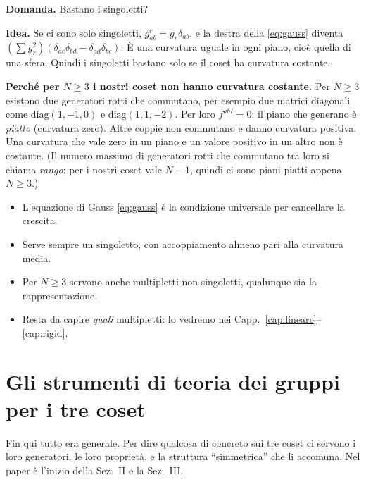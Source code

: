 \documentclass[11pt,a4paper]{article}
\numberwithin{equation}{section}
\theoremstyle{remark}
\begin{document}
\textbf{Domanda.} Bastano i singoletti?

\textbf{Idea.} Se ci sono solo singoletti, $g^r_{ab}=g_r\delta_{ab}$, e la destra della \eqref{eq:gauss} diventa $(\sum g_r^2)(\delta_{ac}\delta_{bd}-\delta_{ad}\delta_{bc})$. È una curvatura uguale in ogni piano, cioè quella di una sfera. Quindi i singoletti bastano solo se il coset ha curvatura costante.

\textbf{Perché per $N\ge3$ i nostri coset non hanno curvatura costante.} Per $N\ge3$ esistono due generatori rotti che commutano, per esempio due matrici diagonali come $\mathrm{diag}(1,-1,0)$ e $\mathrm{diag}(1,1,-2)$. Per loro $f^{abI}=0$: il piano che generano è \emph{piatto} (curvatura zero). Altre coppie non commutano e danno curvatura positiva. Una curvatura che vale zero in un piano e un valore positivo in un altro non è costante. (Il numero massimo di generatori rotti che commutano tra loro si chiama \emph{rango}; per i nostri coset vale $N-1$, quindi ci sono piani piatti appena $N\ge3$.)

\begin{porta}
\begin{itemize}[nosep]
\item L'equazione di Gauss \eqref{eq:gauss} è la condizione universale per cancellare la crescita.
\item Serve sempre un singoletto, con accoppiamento almeno pari alla curvatura media.
\item Per $N\ge3$ servono anche multipletti non singoletti, qualunque sia la rappresentazione.
\item Resta da capire \emph{quali} multipletti: lo vedremo nei Capp.~\ref{cap:lineare}--\ref{cap:rigid}.
\end{itemize}
\end{porta}

\section{Gli strumenti di teoria dei gruppi per i tre coset}
\label{cap:gruppi}

\begin{dove}
Fin qui tutto era generale. Per dire qualcosa di concreto sui tre coset ci servono i loro generatori, le loro proprietà, e la struttura ``simmetrica'' che li accomuna. Nel paper è l'inizio della Sez.~II e la Sez.~III.
\end{dove}
\end{document}
